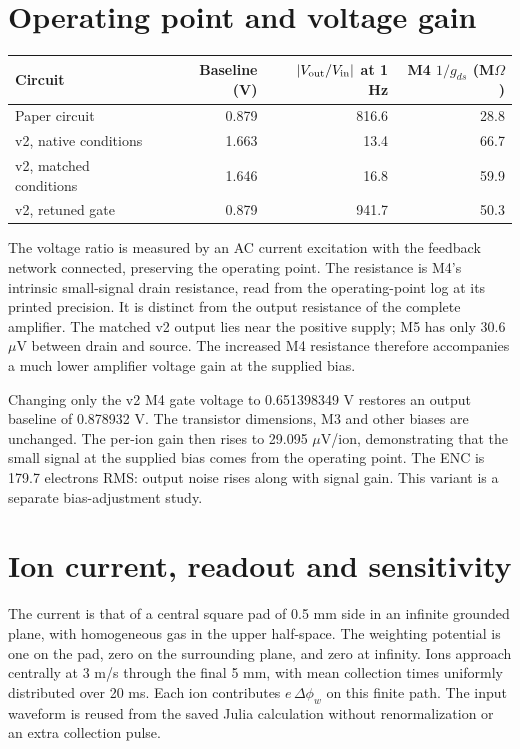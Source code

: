 \documentclass[11pt,a4paper]{article}
\begin{document}
\section*{Operating point and voltage gain}
\begin{center}\begin{tabular}{lrrr}\toprule
Circuit & Baseline (V) & $|V_{\rm out}/V_{\rm in}|$ at 1 Hz & M4 $1/g_{ds}$ (M$\Omega$)\\\midrule
Paper circuit & 0.879 & 816.6 & 28.8 \\
v2, native conditions & 1.663 & 13.4 & 66.7 \\
v2, matched conditions & 1.646 & 16.8 & 59.9 \\
v2, retuned gate & 0.879 & 941.7 & 50.3 \\
\bottomrule\end{tabular}\end{center}
The voltage ratio is measured by an AC current excitation with the feedback
network connected, preserving the operating point. The resistance is M4's
intrinsic small-signal drain resistance, read from the operating-point log
at its printed precision. It is distinct from the output resistance of the
complete amplifier. The matched v2 output lies near the positive supply;
M5 has only 30.6 $\mu$V between drain and source. The increased M4
resistance therefore accompanies a much lower amplifier voltage gain at
the supplied bias.

Changing only the v2 M4 gate voltage to 0.651398349 V restores an output
baseline of 0.878932 V. The transistor dimensions, M3 and other biases
are unchanged. The per-ion gain then rises to 29.095 $\mu$V/ion,
demonstrating that the small signal at the supplied bias comes from the
operating point. The ENC is 179.7 electrons RMS: output noise rises
along with signal gain. This variant is a separate bias-adjustment study.

\section*{Ion current, readout and sensitivity}
The current is that of a central square pad of 0.5 mm side in an infinite
grounded plane, with homogeneous gas in the upper half-space. The weighting
potential is one on the pad, zero on the surrounding plane, and zero at
infinity. Ions approach centrally at 3 m/s through the final 5 mm, with mean
collection times uniformly distributed over 20 ms. Each ion contributes
$e\,\Delta\phi_w$ on this finite path. The input waveform is reused from the
saved Julia calculation without renormalization or an extra collection pulse.
\end{document}
